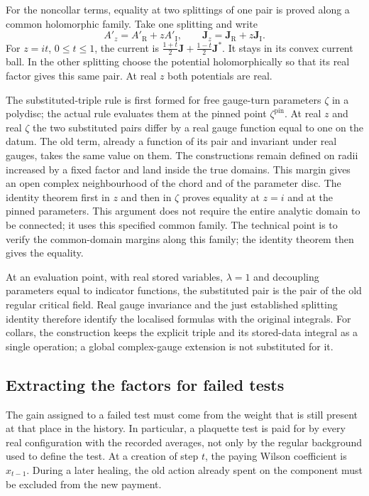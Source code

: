 \documentclass[11pt,letterpaper,reqno]{amsart}
\theoremstyle{definition}
\theoremstyle{remark}
\begin{document}
For the noncollar terms, equality
at two splittings of one pair is
proved along a common holomorphic
family. Take one splitting and write
\[
 A'_z=A'_{\mathrm R}+zA'_{\mathrm I},\qquad
 \mathbf J_z=\mathbf J_{\mathrm R}
                                   +z\mathbf J_{\mathrm I}.
\]
For $z=it$, $0\le t\le1$, the
current is
$\frac{1+t}2\mathbf J+
 \frac{1-t}2\mathbf J^*$.
It stays in its convex current
ball. In the other splitting choose
the potential holomorphically so
that its real factor gives this
same pair. At real $z$ both
potentials are real.

The substituted-triple rule is
first formed for free gauge-turn
parameters $\zeta$ in a polydisc;
the actual rule evaluates them at
the pinned point
$\zeta^{\mathrm{pin}}$.
At real $z$ and real $\zeta$ the
two substituted pairs differ by
a real gauge function equal to
one on the datum. The old term,
already a function of its pair
and invariant under real gauges,
takes the same value on them.
The constructions remain defined
on radii increased by a fixed
factor and land inside the true
domains. This margin gives an
open complex neighbourhood of the
chord and of the parameter disc.
The identity theorem first in
$z$ and then in $\zeta$ proves
equality at $z=i$ and at the
pinned parameters. This argument
does not require the entire
analytic domain to be connected;
it uses this specified common
family. The technical point is to
verify the common-domain margins
along this family; the identity
theorem then gives the equality.

At an evaluation point, with
real stored variables,
$\lambda=1$ and decoupling
parameters equal to indicator
functions, the substituted pair
is the pair of the old regular
critical field. Real gauge
invariance and the just established
splitting identity therefore
identify the localised formulas
with the original integrals.
For collars, the construction
keeps the explicit triple and
its stored-data integral as a
single operation; a global
complex-gauge extension is not
substituted for it.

\subsection{Extracting the factors for failed tests}

The gain assigned to a failed test must come from the weight that
is still present at that place in the history. In particular, a
plaquette test is paid for by every real configuration with the
recorded averages, not only by the regular background used to
define the test. At a creation of step $t$, the paying Wilson
coefficient is $x_{t-1}$. During a later healing, the old action
already spent on the component must be excluded from the new
payment.
\end{document}
